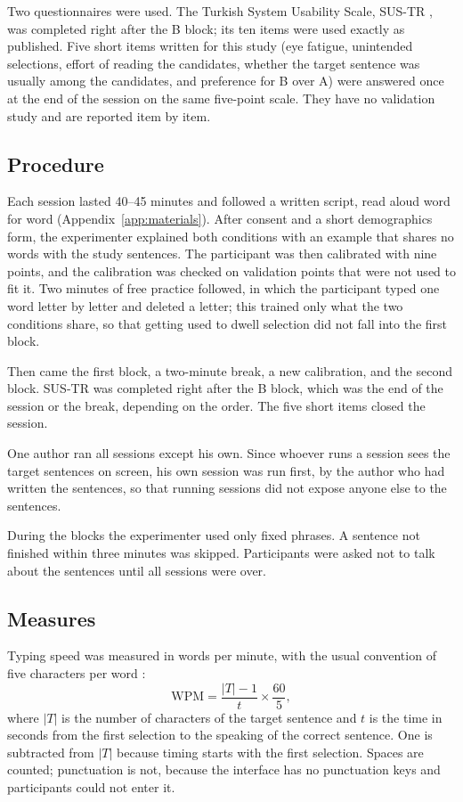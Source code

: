 Two questionnaires were used. The Turkish System Usability Scale, SUS-TR
\citep{demirkol2018sustr}, was completed right after the B block; its ten items were used exactly as
published. Five short items written for this study (eye fatigue, unintended selections, effort of
reading the candidates, whether the target sentence was usually among the candidates, and preference
for B over A) were answered once at the end of the session on the same five-point scale. They have no
validation study and are reported item by item.

\subsection{Procedure}
\label{sec:b-procedure}

Each session lasted 40--45 minutes and followed a written script, read aloud word for word
(Appendix~\ref{app:materials}). After consent and a short demographics form, the experimenter explained
both conditions with an example that shares no words with the study sentences. The participant was then
calibrated with nine points, and the calibration was checked on validation points that were not used to
fit it. Two minutes of free practice followed, in which the participant typed one word letter by letter
and deleted a letter; this trained only what the two conditions share, so that getting used to dwell
selection did not fall into the first block.

Then came the first block, a two-minute break, a new calibration, and the second block. SUS-TR was
completed right after the B block, which was the end of the session or the break, depending on the
order. The five short items closed the session.

One author ran all sessions except his own. Since whoever runs a session sees the target sentences on
screen, his own session was run first, by the author who had written the sentences, so that running
sessions did not expose anyone else to the sentences.

During the blocks the experimenter used only fixed phrases. A sentence not finished within three
minutes was skipped. Participants were asked not to talk about the sentences until all sessions were
over.

\subsection{Measures}
\label{sec:b-measures}

Typing speed was measured in words per minute, with the usual convention of five characters per word
\citep{wobbrock2007measures}:
\begin{equation}
  \mathrm{WPM} = \frac{|T| - 1}{t} \times \frac{60}{5},
\end{equation}
where $|T|$ is the number of characters of the target sentence and $t$ is the time in seconds from the
first selection to the speaking of the correct sentence. One is subtracted from $|T|$ because timing
starts with the first selection. Spaces are counted; punctuation is not, because the interface has no
punctuation keys and participants could not enter it.

